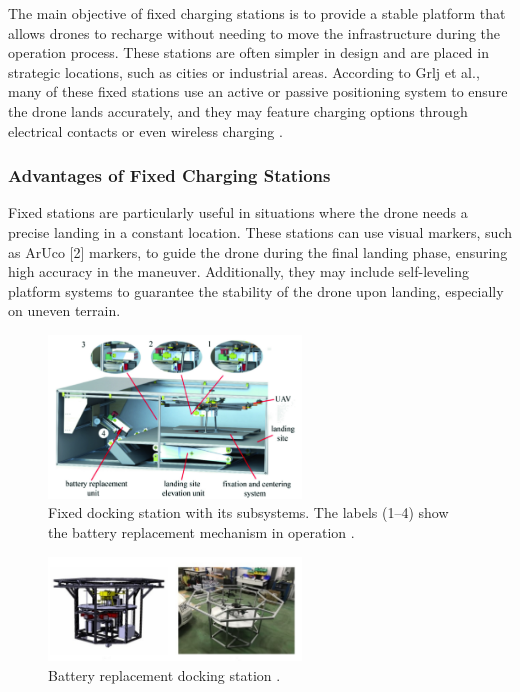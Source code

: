     The main objective of fixed charging stations is to provide a stable platform that allows drones to recharge without needing to move the infrastructure during the operation process. These stations are often simpler in design and are placed in strategic locations, such as cities or industrial areas. According to Grlj et al., many of these fixed stations use an active or passive positioning system to ensure the drone lands accurately, and they may feature charging options through electrical contacts or even wireless charging \cite{grlj_docking_stations}.

\subsubsection{Advantages of Fixed Charging Stations}

    Fixed stations are particularly useful in situations where the drone needs a precise landing in a constant location. These stations can use visual markers, such as ArUco [2] markers, to guide the drone during the final landing phase, ensuring high accuracy in the maneuver. Additionally, they may include self-leveling platform systems to guarantee the stability of the drone upon landing, especially on uneven terrain.

    \begin{figure}[h!]
        \centering
        \includegraphics[width=0.6\textwidth]{pictures/fixed_charging_1.png}
        \caption{Fixed docking station with its subsystems. The labels (1–4) show the battery replacement mechanism in operation \cite{grlj_docking_stations}.}
        \label{fig:fixed_charging}
    \end{figure}

    \begin{figure}[h!]
        \centering
        \includegraphics[width=0.6\textwidth]{pictures/fixed_2.png}
        \caption{Battery replacement docking station \cite{grlj_docking_stations}.}
        \label{fig:fixed_charging}
    \end{figure}

